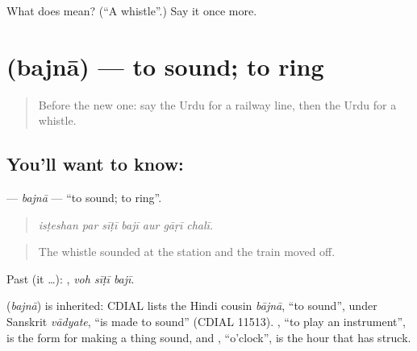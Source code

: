 \begin{tcolorbox}[breakable,colback=teal!4,colframe=teal!35!black,title={Before you move on}]
What does  mean? (\textquotedblleft{}A whistle\textquotedblright{}.) Say it once more.
\end{tcolorbox}
\section[\texorpdfstring{\ur{بجنا} (bajnā)}{بجنا (bajnā)}]{ (bajnā) — to sound; to ring}

\label{lesson:UR-C386-bajna}



\begin{quote}
Before the new one: say the Urdu for a railway line, then the Urdu for a whistle.
\end{quote}

\subsection*{You'll want to know: }
\textbf{} — \emph{bajnā} — \textquotedblleft{}to sound; to ring\textquotedblright{}.

\begin{quote}
      
\end{quote}

\begin{quote}
\emph{isṭeshan par sīṭī bajī aur gāṛī chalī.}
\end{quote}

\begin{quote}
The whistle sounded at the station and the train moved off.
\end{quote}

Past (it …):   , \emph{voh sīṭī bajī}.

\begin{cousinweb}
\textbf{} (\emph{bajnā}) is inherited: CDIAL lists the Hindi cousin \emph{bājnā}, \textquotedblleft{}to sound\textquotedblright{}, under Sanskrit \emph{vādyate}, \textquotedblleft{}is made to sound\textquotedblright{} (CDIAL 11513). \textbf{}, \textquotedblleft{}to play an instrument\textquotedblright{}, is the form for making a thing sound, and \textbf{}, \textquotedblleft{}o'clock\textquotedblright{}, is the hour that has struck.
\end{cousinweb}

